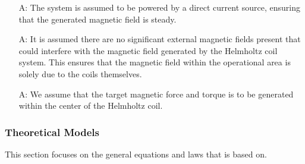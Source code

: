 \documentclass[12pt]{article}
\newcounter{assumpnum} %
\begin{document}
\begin{itemize}

\item[A\refstepcounter{assumpnum}\theassumpnum \label{A_directPower}:]
The system is assumed to be powered by a direct current source, ensuring that the generated magnetic field is steady.

\item[A\refstepcounter{assumpnum}\theassumpnum \label{A_noExtField}:]
It is assumed there are no significant external magnetic fields present that could interfere with the magnetic field generated by the Helmholtz coil system. This ensures that the magnetic field within the operational area is solely due to the coils themselves.

\item[A\refstepcounter{assumpnum}\theassumpnum \label{A_generateWithinCenter}:]
We assume that the target magnetic force and torque is to be generated within the center of the Helmholtz coil.

\end{itemize}

\subsubsection{Theoretical Models}\label{sec_theoretical}
This section focuses on the general equations and laws that \progname{} is based
on.  
\end{document}
